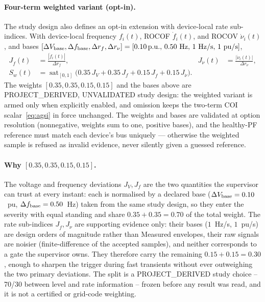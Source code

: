 \documentclass[12pt,a4paper]{article}
\DeclareMathOperator{\sat}{sat}
\newcommand{\pu}{\ifmmode\,\mathrm{p.u.}\else\ p.u.\fi}
\begin{document}
\paragraph{Four-term weighted variant (opt-in).}
The study design also defines an opt-in extension with device-local rate
sub-indices.  With device-local frequency $f_i(t)$, ROCOF
$\dot f_i(t)$, and ROCOV $\dot\nu_i(t)$, and bases
$[\Delta V_{\rm base},\Delta f_{\rm base},\Delta r_{f},\Delta r_{\nu}]
=[0.10\pu,\,0.50~\mathrm{Hz},\,1~\mathrm{Hz/s},\,1~\mathrm{pu/s}]$,
\begin{equation}
\begin{aligned}
  J_{\dot f}(t)&=\frac{|\dot f_i(t)|}{\Delta r_{f}},&
  J_{\dot\nu}(t)&=\frac{|\dot\nu_i(t)|}{\Delta r_{\nu}},\\
  S_{w}(t)&=\sat_{[0,1]}\!\bigl(
      0.35\,J_V+0.35\,J_f+0.15\,J_{\dot f}+0.15\,J_{\dot\nu}\bigr).&&
\end{aligned}
\label{eq:weighted}
\end{equation}
The weights $[0.35,0.35,0.15,0.15]$ and the bases above are
\textsf{PROJECT\_DERIVED, UNVALIDATED} study design: the weighted variant is
armed only when explicitly enabled, and omission keeps the two-term
COI scalar~\eqref{eq:agsi} in force unchanged.  The weights and bases are
validated at option resolution (nonnegative, weights sum to one, positive
bases), and the healthy-PF reference must match each device's bus uniquely ---
otherwise the weighted sample is refused as invalid evidence, never silently
given a guessed reference.

\paragraph{Why $[0.35,0.35,0.15,0.15]$.}
The voltage and frequency deviations $J_V,J_f$ are the two quantities the
supervisor can trust at every instant: each is normalised by a declared base
($\Delta V_{\rm base}=0.10$~pu, $\Delta f_{\rm base}=0.50$~Hz) taken from the
same study design, so they enter the severity with equal standing and share
$0.35+0.35=0.70$ of the total weight.  The rate sub-indices $J_{\dot f},
J_{\dot\nu}$ are supporting evidence only: their bases ($1$~Hz/s, $1$~pu/s)
are design orders of magnitude rather than Measured envelopes, their raw
signals are noisier (finite-difference of the accepted samples), and neither
corresponds to a gate the supervisor owns.  They therefore carry the remaining
$0.15+0.15=0.30$, enough to sharpen the trigger during fast transients without
ever outweighing the two primary deviations.  The split is a
\textsf{PROJECT\_DERIVED} study choice -- 70/30 between level and rate
information -- frozen before any result was read, and it is not a certified
or grid-code weighting.
\end{document}
